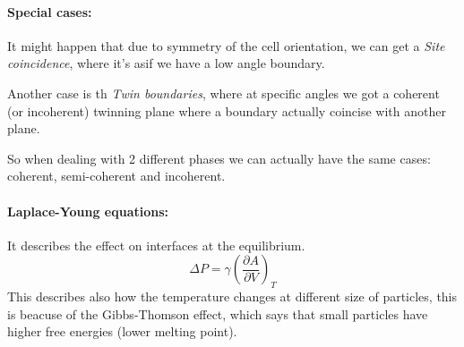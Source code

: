 \paragraph{Special cases:}
It might happen that due to symmetry of the cell orientation, we can get a \textit{Site coincidence}, where it's asif we have a low angle boundary. 

\noindent Another case is th \textit{Twin boundaries}, where at specific angles we got a coherent (or incoherent) twinning plane where a boundary actually coincise with another plane.

So when dealing with 2 different phases we can actually have the same cases: coherent, semi-coherent and incoherent.

\paragraph{Laplace-Young equations:} It describes the effect on interfaces at the equilibrium.
\begin{equation}
    \Delta P = \gamma \left(\frac{\partial A}{\partial V}\right)_T
\end{equation}
This describes also how the temperature changes at different size of particles, this is beacuse of the Gibbs-Thomson effect, which says that small particles have higher free energies (lower melting point).